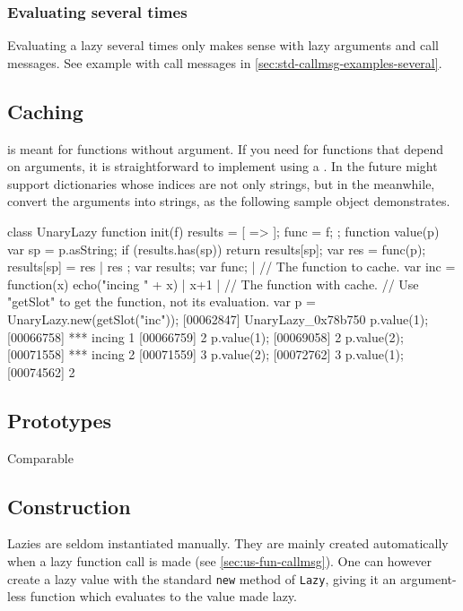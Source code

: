 \subsubsection{Evaluating several times}

Evaluating a lazy several times only makes sense with lazy arguments and
call messages. See example with call messages in
\autoref{sec:std-callmsg-examples-several}.


\subsection{Caching}

 is meant for functions without argument.  If you need
 for functions that depend on arguments, it is straightforward
to implement using a .  In the future \us might
support dictionaries whose indices are not only strings, but in the
meanwhile, convert the arguments into strings, as the following sample
object demonstrates.

\begin{urbiscript}
class UnaryLazy
{
  function init(f)
  {
    results = [ => ];
    func = f;
  };
  function value(p)
  {
    var sp = p.asString;
    if (results.has(sp))
      return results[sp];
    var res = func(p);
    results[sp] = res |
    res
  };
  var results;
  var func;
} |
// The function to cache.
var inc = function(x) { echo("incing " + x) | x+1 } |
// The function with cache.
// Use "getSlot" to get the function, not its evaluation.
var p = UnaryLazy.new(getSlot("inc"));
[00062847] UnaryLazy_0x78b750
p.value(1);
[00066758] *** incing 1
[00066759] 2
p.value(1);
[00069058] 2
p.value(2);
[00071558] *** incing 2
[00071559] 3
p.value(2);
[00072762] 3
p.value(1);
[00074562] 2
\end{urbiscript}

\subsection{Prototypes}

\begin{refObjects}
\item[Comparable]
\end{refObjects}

\subsection{Construction}

Lazies are seldom instantiated manually. They are mainly created
automatically when a lazy function call is made (see
\autoref{sec:us-fun-callmsg}). One can however create a lazy value with the
standard \lstinline|new| method of \lstinline|Lazy|, giving it an
argument-less function which evaluates to the value made lazy.

